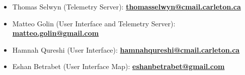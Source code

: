 \begin{itemize}
    \item Thomas Selwyn (Telemetry Server): \href{mailto:thomasselwyn@cmail.carleton.ca?subject=Question regarding CU InSpace Software}{\textbf{thomasselwyn@cmail.carleton.ca}}
    \item Matteo Golin (User Interface and Telemetry Server): \href{mailto:matteo.golin@gmail.com?subject=Question regarding CU InSpace Software}{\textbf{matteo.golin@gmail.com}}
    \item Hamnah Qureshi (User Interface): \href{mailto:hamnahqureshi@cmail.carleton.ca?subject=Question regarding CU InSpace Software}{\textbf{hamnahqureshi@cmail.carleton.ca}}
    \item Eshan Betrabet (User Interface Map): \href{mailto:eshanbetrabet@gmail.com?subject=Question regarding CU InSpace Software}{\textbf{eshanbetrabet@gmail.com}}
\end{itemize}
